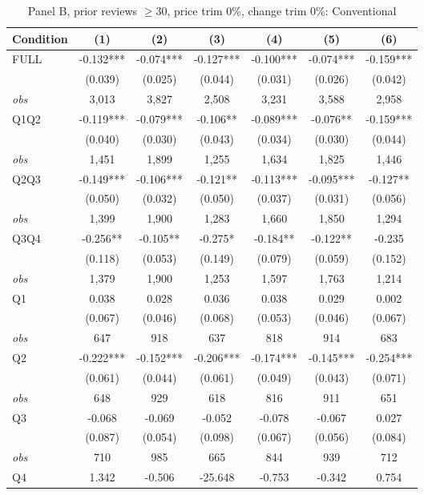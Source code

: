 \begin{table}[!htbp]
\centering
\caption{Panel B, prior reviews $\geq 30$, price trim 0\%, change trim 0\%: Conventional}
\label{tab:b:trim00:reviews30:conventional}
\small
\begin{tabular}{lcccccc}
\toprule
Condition & (1) & (2) & (3) & (4) & (5) & (6) \\
\midrule
FULL & -0.132*** & -0.074*** & -0.127*** & -0.100*** & -0.074*** & -0.159*** \\
 & (0.039) & (0.025) & (0.044) & (0.031) & (0.026) & (0.042) \\
\textit{obs} & 3,013 & 3,827 & 2,508 & 3,231 & 3,588 & 2,958 \\
Q1Q2 & -0.119*** & -0.079*** & -0.106** & -0.089*** & -0.076** & -0.159*** \\
 & (0.040) & (0.030) & (0.043) & (0.034) & (0.030) & (0.044) \\
\textit{obs} & 1,451 & 1,899 & 1,255 & 1,634 & 1,825 & 1,446 \\
Q2Q3 & -0.149*** & -0.106*** & -0.121** & -0.113*** & -0.095*** & -0.127** \\
 & (0.050) & (0.032) & (0.050) & (0.037) & (0.031) & (0.056) \\
\textit{obs} & 1,399 & 1,900 & 1,283 & 1,660 & 1,850 & 1,294 \\
Q3Q4 & -0.256** & -0.105** & -0.275* & -0.184** & -0.122** & -0.235 \\
 & (0.118) & (0.053) & (0.149) & (0.079) & (0.059) & (0.152) \\
\textit{obs} & 1,379 & 1,900 & 1,253 & 1,597 & 1,763 & 1,214 \\
Q1 & 0.038 & 0.028 & 0.036 & 0.038 & 0.029 & 0.002 \\
 & (0.067) & (0.046) & (0.068) & (0.053) & (0.046) & (0.067) \\
\textit{obs} & 647 & 918 & 637 & 818 & 914 & 683 \\
Q2 & -0.222*** & -0.152*** & -0.206*** & -0.174*** & -0.145*** & -0.254*** \\
 & (0.061) & (0.044) & (0.061) & (0.049) & (0.043) & (0.071) \\
\textit{obs} & 648 & 929 & 618 & 816 & 911 & 651 \\
Q3 & -0.068 & -0.069 & -0.052 & -0.078 & -0.067 & 0.027 \\
 & (0.087) & (0.054) & (0.098) & (0.067) & (0.056) & (0.084) \\
\textit{obs} & 710 & 985 & 665 & 844 & 939 & 712 \\
Q4 & 1.342 & -0.506 & -25.648 & -0.753 & -0.342 & 0.754 \\

\end{tabular}
\end{table}
